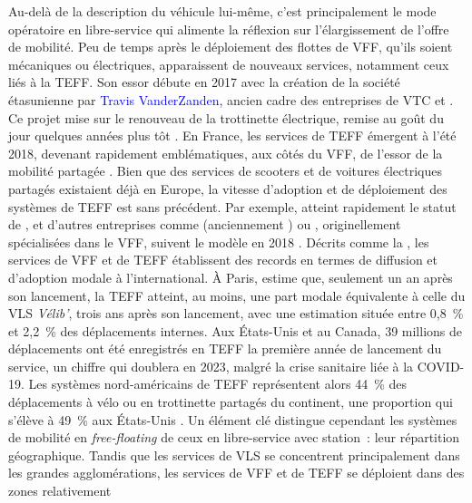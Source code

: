 \begin{refsegment}
Au-delà de la description du véhicule lui-même, c'est principalement le mode opératoire en libre-service qui alimente la réflexion sur l'élargissement de l'offre de mobilité. Peu de temps après le déploiement des flottes de \acrshort{VFF}, qu’ils soient mécaniques ou électriques, apparaissent de nouveaux services, notamment ceux liés à la \acrfull{TEFF}. Son essor débute en 2017 avec la création de la société étasunienne  par \textcolor{blue}{Travis VanderZanden}, ancien cadre des entreprises de \acrshort{VTC}  et  \textcolor{blue}{\autocite[13]{nlc_micromobility_2019}}. Ce projet mise sur le renouveau de la trottinette électrique, remise au goût du jour quelques années plus tôt \textcolor{blue}{\autocite{easy_electric_life_free_2020}}. En France, les services de \acrshort{TEFF} émergent à l’été 2018, devenant rapidement emblématiques, aux côtés du \acrshort{VFF}, de l’essor de la mobilité partagée \textcolor{blue}{\autocite[1]{bortoli_consequential_2020}}. Bien que des services de scooters et de voitures électriques partagés existaient déjà en Europe, la vitesse d’adoption et de déploiement des systèmes de \acrshort{TEFF} est sans précédent. Par exemple,  atteint rapidement le statut de , et d'autres entreprises comme  (anciennement ) ou , originellement spécialisées dans le \acrshort{VFF}, suivent le modèle en 2018 \textcolor{blue}{\autocite[4]{clewlow_micro-mobility_2018}}. Décrits comme la  \textcolor{blue}{\autocite[1]{boffi_extrait_2019}}, les services de \acrshort{VFF} et de \acrshort{TEFF} établissent des records en termes de diffusion et d’adoption modale à l'international. À Paris, \textcolor{blue}{\textcite[146]{6t-bureau_de_recherche_usages_2019}} estime que, seulement un an après son lancement, la \acrshort{TEFF} atteint, au moins, une part modale équivalente à celle du \acrshort{VLS} \textsl{Vélib’}, trois ans après son lancement, avec une estimation située entre 0,8~\% et 2,2~\% des déplacements internes. Aux États-Unis et au Canada, 39 millions de déplacements ont été enregistrés en \acrshort{TEFF} la première année de lancement du service, un chiffre qui doublera en 2023, malgré la crise sanitaire liée à la COVID-19. Les systèmes nord-américains de \acrshort{TEFF} représentent alors 44~\% des déplacements à vélo ou en trottinette partagés du continent, une proportion qui s'élève à 49~\% aux États-Unis \textcolor{blue}{\autocites[10]{nacto_shared_2019}[10]{nacto_shared_2020}[3-5]{nacto_shared_2024}}. Un élément clé distingue cependant les systèmes de mobilité en \textsl{free-floating} de ceux en libre-service avec station~: leur répartition géographique. Tandis que les services de \acrshort{VLS} se concentrent principalement dans les grandes agglomérations, les services de \acrshort{VFF} et de \acrshort{TEFF} se déploient dans des zones relativement 
\end{refsegment}
